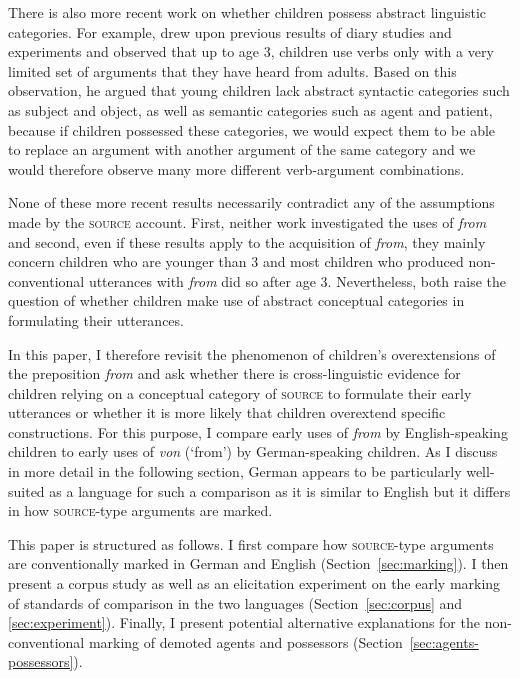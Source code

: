 \documentclass[lucida]{sp} %
\begin{document}
There is also more recent work on whether children possess abstract linguistic categories. For example, \cite{tomasello2000} drew upon previous results of diary studies and experiments and observed that up to age 3, children use verbs only with a very limited set of arguments that they have heard from adults. Based on this observation, he argued that young children lack abstract syntactic categories such as subject and object, as well as semantic categories such as agent and patient, because if children possessed these categories, we would expect them to be able to replace an argument with another argument of the same category and we would therefore observe many more different verb-argument combinations.

None of these more recent results necessarily contradict any of the assumptions made by the \textsc{source} account. First, neither work investigated the uses of \textit{from} and second, even if these results apply to the acquisition of \textit{from}, they mainly concern children who are younger than 3 and most children who produced non-conventional utterances with \textit{from} did so after age 3. Nevertheless, both raise the question of whether children make use of abstract conceptual categories in formulating their utterances. 

In this paper, I therefore revisit the phenomenon of children's overextensions of the preposition \textit{from} and ask whether there is cross-linguistic evidence for children relying on a conceptual category of \textsc{source} to formulate their early utterances or whether it is more likely that children overextend specific constructions. 
For this purpose, I compare early uses of \textit{from} by English-speaking children to early uses of \textit{von} (`from') by German-speaking children.  As I discuss in more detail in the following section, German appears to be particularly well-suited as a language for such a comparison as it is similar to English but it differs in how \textsc{source}-type arguments are marked. 

This paper is structured as follows. I first compare how \textsc{source}-type arguments are conventionally marked in German and English (Section~\ref{sec:marking}). I then present a corpus study as well as an elicitation experiment on the early marking of standards of comparison in the two languages (Section~\ref{sec:corpus} and \ref{sec:experiment}). Finally, I present potential alternative explanations for the non-conventional marking of demoted agents and possessors (Section~\ref{sec:agents-possessors}). 
\end{document}
